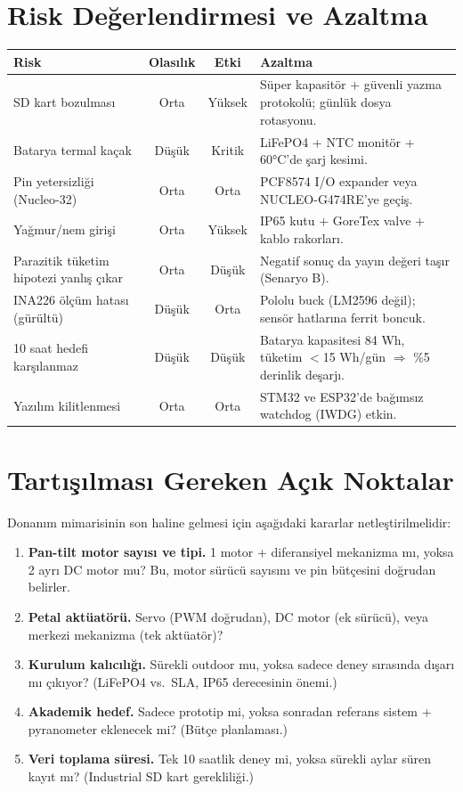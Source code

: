 \documentclass[11pt,a4paper]{article}
\begin{document}
\section{Risk Değerlendirmesi ve Azaltma}

\begin{longtable}{|p{4cm}|c|c|p{6cm}|}
\hline
\rowcolor{primary!15}
\textbf{Risk} & \textbf{Olasılık} & \textbf{Etki} & \textbf{Azaltma} \\
\hline
\endhead

SD kart bozulması & Orta & Yüksek & Süper kapasitör + güvenli yazma protokolü; günlük dosya rotasyonu. \\
\hline
Batarya termal kaçak & Düşük & Kritik & LiFePO4 + NTC monitör + 60°C'de şarj kesimi. \\
\hline
Pin yetersizliği (Nucleo-32) & Orta & Orta & PCF8574 I/O expander veya NUCLEO-G474RE'ye geçiş. \\
\hline
Yağmur/nem girişi & Orta & Yüksek & IP65 kutu + GoreTex valve + kablo rakorları. \\
\hline
Parazitik tüketim hipotezi yanlış çıkar & Orta & Düşük & Negatif sonuç da yayın değeri taşır (Senaryo B). \\
\hline
INA226 ölçüm hatası (gürültü) & Düşük & Orta & Pololu buck (LM2596 değil); sensör hatlarına ferrit boncuk. \\
\hline
10 saat hedefi karşılanmaz & Düşük & Düşük & Batarya kapasitesi 84 Wh, tüketim $<$15 Wh/gün $\Rightarrow$ \%5 derinlik deşarjı. \\
\hline
Yazılım kilitlenmesi & Orta & Orta & STM32 ve ESP32'de bağımsız watchdog (IWDG) etkin. \\
\hline
\end{longtable}

\section{Tartışılması Gereken Açık Noktalar}

Donanım mimarisinin son haline gelmesi için aşağıdaki kararlar netleştirilmelidir:

\begin{enumerate}
    \item \textbf{Pan-tilt motor sayısı ve tipi.} 1 motor + diferansiyel mekanizma mı, yoksa 2 ayrı DC motor mu? Bu, motor sürücü sayısını ve pin bütçesini doğrudan belirler.
    \item \textbf{Petal aktüatörü.} Servo (PWM doğrudan), DC motor (ek sürücü), veya merkezi mekanizma (tek aktüatör)?
    \item \textbf{Kurulum kalıcılığı.} Sürekli outdoor mu, yoksa sadece deney sırasında dışarı mı çıkıyor? (LiFePO4 vs.\ SLA, IP65 derecesinin önemi.)
    \item \textbf{Akademik hedef.} Sadece prototip mi, yoksa sonradan referans sistem + pyranometer eklenecek mi? (Bütçe planlaması.)
    \item \textbf{Veri toplama süresi.} Tek 10 saatlik deney mi, yoksa sürekli aylar süren kayıt mı? (Industrial SD kart gerekliliği.)
\end{enumerate}
\end{document}

